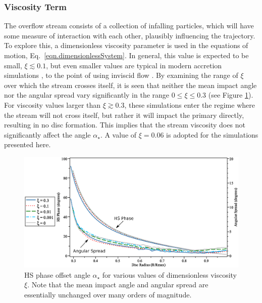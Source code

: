\documentclass[preprint2]{aastex}
\newcommand{\note}[1]{[$\blacktriangleright$~\textbf{#1}~$\blacktriangleleft$]}
\begin{document}
\subsubsection{Viscosity Term}
The overflow stream consists of a collection of infalling particles, which will
have some measure of interaction with each other, plausibly
influencing the trajectory.  To explore this, a dimensionless
viscosity parameter is used in the equations of motion, Eq.\
\ref{eqn.dimensionlessSystem}.  In general, this value is expected to
be small, $\xi \lesssim 0.1$, but even smaller values are typical in
modern accretion simulations \citep{2008A&A...487..671K}, to the point
of using inviscid flow \citep{1992MNRAS.255P..17S}.  By examining the
range of $\xi$ over which the stream crosses itself, it is seen that
neither the mean impact angle nor the angular spread vary
significantly in the range $0 \le \xi \le 0.3$ (see Figure
\ref{fig.impact_angle_various}).  For viscosity values larger than
$\xi \gtrsim 0.3$, these simulations enter the regime where the stream
will not cross itself, but rather it will impact the primary directly,
resulting in no disc formation.  This implies that the stream
viscosity does not significantly affect the angle $\alpha_\star$.  A value
of $\xi = 0.06$ is adopted for the simulations presented here.

\begin{figure}[t!]
  \includegraphics[width=\textwidth]{./impact_angle_various2.eps}
  \caption{HS phase offset angle $\alpha_\star$ for various values of
  dimensionless viscosity $\xi$.  Note that the mean impact angle and
  angular spread are essentially unchanged over many orders of
  magnitude. }
  \label{fig.impact_angle_various}
\end{figure}
\end{document}
